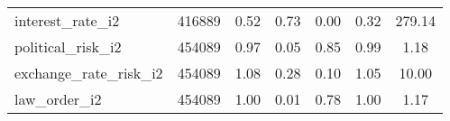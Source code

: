 \begin{table}[htbp]
\begin{tabular}{l*{1}{cccccc}}
interest\_rate\_i2    &      416889&        0.52&        0.73&        0.00&        0.32&      279.14\\
political\_risk\_i2   &      454089&        0.97&        0.05&        0.85&        0.99&        1.18\\
exchange\_rate\_risk\_i2&      454089&        1.08&        0.28&        0.10&        1.05&       10.00\\
law\_order\_i2        &      454089&        1.00&        0.01&        0.78&        1.00&        1.17\\
\hline\hline
\end{tabular}
\end{table}
